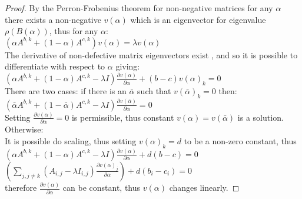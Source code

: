 \begin{proof}
By the Perron-Frobenius theorem for non-negative matrices for any $\alpha$ there exists a non-negative $v(\alpha)$ which is an eigenvector for eigenvalue $\rho(B(\alpha))$, thus for any $\alpha$: \\
$\left(\alpha A^{b,k} + (1-\alpha)A^{c,k}\right)v(\alpha)=\lambda v(\alpha)$\\
The derivative of non-defective matrix eigenvectors exist \cite{Aa2006ComputationOE,juang1989eigenvalue}, and so it is possible to differentiate with respect to $\alpha$ giving:\\
$\left(\alpha A^{b,k} + (1-\alpha)A^{c,k} - \lambda I\right)\frac{\partial v(\alpha)}{\partial\alpha}+(b-c)v(\alpha)_k=0$\\
There are two cases:  if there is an $\bar{\alpha}$ such that $v(\bar{\alpha})_k=0$ then:\\
\-\hspace{8mm}$\left(\bar{\alpha} A^{b,k} + (1-\bar{\alpha})A^{c,k} - \lambda I\right)\frac{\partial v(\bar{\alpha})}{\partial\alpha}=0$\\
\-\hspace{8mm}Setting $\frac{\partial v(\alpha)}{\partial\alpha}=0$ is permissible, thus constant $v(\alpha)=v(\bar{\alpha})$ is a solution.\\
Otherwise:\\
\-\hspace{8mm}It is possible do scaling, thus setting $v(\alpha)_k=d$ to be a non-zero constant, thus\\
\-\hspace{8mm}$\left(\alpha A^{b,k} + (1-\alpha)A^{c,k} - \lambda I\right)\frac{\partial v(\alpha)}{\partial\alpha}+d(b-c)=0$\\
\-\hspace{8mm}$\left(\sum_{j,j\ne k}\left(A_{i,j}-\lambda I_{i,j}\right)\frac{\partial v(\alpha)_j}{\partial\alpha}\right) +d(b_i-c_i)=0$\\
\-\hspace{8mm}therefore $\frac{\partial v(\alpha)}{\partial\alpha}$ can be constant, thus $v(\alpha)$ changes linearly.
\end{proof}




